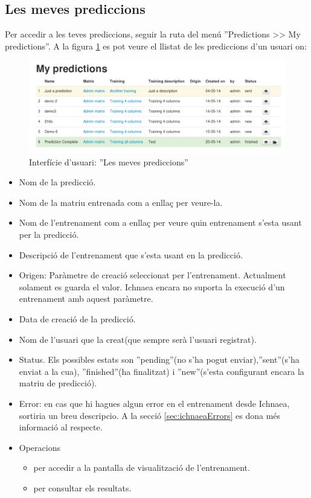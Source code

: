 \subsection{Les meves prediccions}
\label{subsec:myPrediccions}
Per accedir a les teves prediccions, seguir la ruta del menú ''Predictions >> My predictions''. A la figura \ref{fig:my_predictions} es pot veure el llistat de les prediccions d'un usuari on:
\begin{figure}[h!]
  \centering
  \includegraphics[scale=0.4]{img/userguide/my_predictions.png}
  \caption{Interfície d'usuari: ''Les meves prediccions''}
  \label{fig:my_predictions}
\end{figure}
\begin{itemize}
\item Nom de la predicció.
\item Nom de la matriu entrenada com a enllaç per veure-la.
\item Nom de l'entrenament com a enllaç per veure quin entrenament s'esta usant per la predicció.
\item Descripció de l'entrenament que s'esta usant en la predicció.
\item Origen: Paràmetre de creació seleccionat per l'entrenament. Actualment solament es guarda el valor. Ichnaea encara no suporta la execució d'un entrenament amb aquest paràmetre.
\item Data de creaci\'{o} de la predicció.
\item Nom de l'usuari que la creat(que sempre serà l'usuari registrat).
\item Status. Els possibles estats son ''pending''(no s'ha pogut enviar),''sent''(s'ha enviat a la cua), ''finished''(ha finalitzat) i ''new''(s'esta configurant encara la matriu de predicció).
\item Error: en cas que hi hagues algun error en el entrenament desde Ichnaea, sortiria un breu descripcio. A la secció \ref{sec:ichnaeaErrors} es dona m\'{e}s informació al respecte.
\item Operacions
 \begin{itemize}
 \item \iconeyeopen per accedir a la pantalla de visualització de l'entrenament.
 \item \iconresults per consultar els resultats.
 \end{itemize}
\end{itemize}

